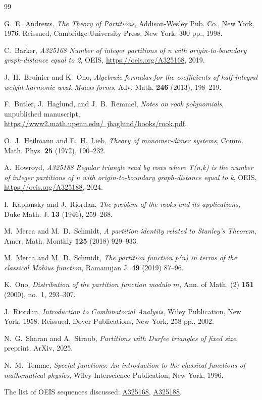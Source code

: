 \documentclass[12pt,reqno]{amsart}
\numberwithin{equation}{section}
\theoremstyle{plain}
\newcommand{\seqnum}[1]{\href{https://oeis.org/#1}{\rm \underline{#1}}}
\begin{document}
	\begin{thebibliography}{99}
	
	G.~E.~Andrews, \emph{The Theory of Partitions}, Addison-Wesley Pub. Co., New York, 1976. Reissued, Cambridge University Press, New York, 300 pp., 1998.
	
	
	C.~Barker, \emph{A325168 Number of integer partitions of n with origin-to-boundary graph-distance equal to 2}, OEIS, \textcolor{magenta}{\href{https://oeis.org/A325168}{https://oeis.org/A325168}}, 2019.
	
	J.~H.~Bruinier and K.~Ono, \textit{Algebraic formulas for the coefficients of half-integral weight harmonic weak Maass forms}, Adv. Math. {\bf 246} (2013), 198--219.
	
	F.~Butler, J.~Haglund, and J.~B.~Remmel, \emph{Notes on rook polynomials}, unpublished manuscript, \textcolor{magenta}{\href{https://www2.math.upenn.edu/~jhaglund/books/rook.pdf}{https://www2.math.upenn.edu/~jhaglund/books/rook.pdf}}.
	
	
	O.~J.~Heilmann and E.~H.~Lieb, \emph{Theory of monomer-dimer systems}, Comm. Math. Phys. \textbf{25} (1972), 190--232.
	
	A.~Howroyd, \emph{A325188 Regular triangle read by rows where T(n,k) is the number of integer partitions of n with origin-to-boundary graph-distance equal to k}, OEIS, \textcolor{magenta}{\href{https://oeis.org/A325188}{https://oeis.org/A325188}}, 2024.
	
	I.~Kaplansky and J.~Riordan, \emph{The problem of the rooks and its applications}, Duke Math. J. \textbf{13} (1946), 259--268.
	
	M.~Merca and M.~D.~Schmidt, \textit{A partition identity related to Stanley's Theorem}, Amer. Math. Monthly \textbf{125} (2018) 929--933.
	
	M.~Merca and M.~D.~Schmidt, \textit{The partition function p(n) in terms of the classical M\"{o}bius function}, Ramanujan J. \textbf{49} (2019) 87--96.
	
	K.~Ono, \textit{Distribution of the partition function modulo $m$}, Ann. of Math. (2) {\bf 151} (2000), no.~1, 293--307.
	
	J.~Riordan, \emph{Introduction to Combinatorial Analysis}, Wiley Publication, New York, 1958. Reissued, Dover Publications, New York, 258 pp., 2002.
	
	N.~G.~Sharan and A.~Straub, \emph{Partitions with Durfee triangles of fixed size}, preprint, ArXiv, 2025.
	
	N.~M.~Temme, \emph{Special functions: An introduction to the classical functions of mathematical physics}, Wiley-Interscience Publication, New York, 1996.
	\end{thebibliography}
	
	The list of OEIS sequences discussed: \seqnum{A325168}, \seqnum{A325188}. 
\end{document}
